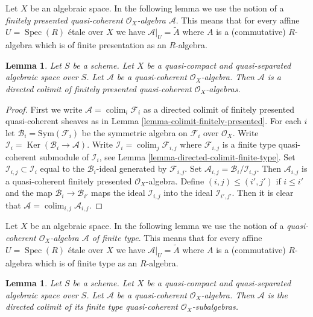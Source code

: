 \documentclass{stacks-project}
\theoremstyle{plain}
\newtheorem{lemma}[subsection]{Lemma}
\theoremstyle{definition}
\theoremstyle{remark}
\numberwithin{equation}{subsection}
\def\colim{\mathop{\mathrm{colim}}\nolimits}
\def\Spec{\mathop{\mathrm{Spec}}}
\def\Ker{\mathop{\mathrm{Ker}}}
\begin{document}
\noindent
Let $X$ be an algebraic space. In the following lemma we use the notion
of a {\it finitely presented quasi-coherent $\mathcal{O}_X$-algebra
$\mathcal{A}$}. This means that for every affine
$U = \Spec(R)$ \'etale over $X$ we have $\mathcal{A}|_U = \widetilde{A}$
where $A$ is a (commutative) $R$-algebra which is of finite presentation
as an $R$-algebra.

\begin{lemma}
\label{lemma-algebra-directed-colimit-finite-presentation}
Let $S$ be a scheme. Let $X$ be a quasi-compact and quasi-separated
algebraic space over $S$.
Let $\mathcal{A}$ be a quasi-coherent $\mathcal{O}_X$-algebra.
Then $\mathcal{A}$ is a directed colimit of finitely presented
quasi-coherent $\mathcal{O}_X$-algebras.
\end{lemma}

\begin{proof}
First we write $\mathcal{A} = \colim_i \mathcal{F}_i$ as a directed
colimit of finitely presented quasi-coherent sheaves as in
Lemma \ref{lemma-colimit-finitely-presented}.
For each $i$ let $\mathcal{B}_i = \text{Sym}(\mathcal{F}_i)$ be the
symmetric algebra on $\mathcal{F}_i$ over $\mathcal{O}_X$. Write
$\mathcal{I}_i = \Ker(\mathcal{B}_i \to \mathcal{A})$. Write
$\mathcal{I}_i = \colim_j \mathcal{F}_{i, j}$ where
$\mathcal{F}_{i, j}$ is a finite type quasi-coherent submodule of
$\mathcal{I}_i$, see
Lemma \ref{lemma-directed-colimit-finite-type}.
Set $\mathcal{I}_{i, j} \subset \mathcal{I}_i$
equal to the $\mathcal{B}_i$-ideal generated by $\mathcal{F}_{i, j}$.
Set $\mathcal{A}_{i, j} = \mathcal{B}_i/\mathcal{I}_{i, j}$.
Then $\mathcal{A}_{i, j}$ is a quasi-coherent finitely presented
$\mathcal{O}_X$-algebra. Define $(i, j) \leq (i', j')$ if
$i \leq i'$ and the map $\mathcal{B}_i \to \mathcal{B}_{i'}$
maps the ideal $\mathcal{I}_{i, j}$ into the ideal $\mathcal{I}_{i', j'}$.
Then it is clear that $\mathcal{A} = \colim_{i, j} \mathcal{A}_{i, j}$.
\end{proof}

\noindent
Let $X$ be an algebraic space. In the following lemma we use the notion
of a {\it quasi-coherent $\mathcal{O}_X$-algebra $\mathcal{A}$
of finite type}. This means that for every affine
$U = \Spec(R)$ \'etale over $X$ we have $\mathcal{A}|_U = \widetilde{A}$
where $A$ is a (commutative) $R$-algebra which is of finite type
as an $R$-algebra.

\begin{lemma}
\label{lemma-algebra-directed-colimit-finite-type}
Let $S$ be a scheme. Let $X$ be a quasi-compact and quasi-separated algebraic
space over $S$. Let $\mathcal{A}$ be a quasi-coherent $\mathcal{O}_X$-algebra.
Then $\mathcal{A}$ is the directed colimit of its finite type
quasi-coherent $\mathcal{O}_X$-subalgebras.
\end{lemma}
\end{document}
